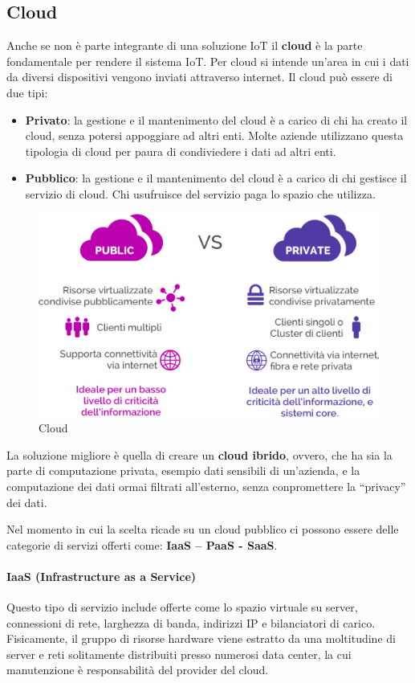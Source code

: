 \documentclass[10pt,a4paper,oneside]{scrbook}
\begin{document}
\subsection{Cloud}
Anche se non è parte integrante di una soluzione IoT il \textbf{cloud} è la parte fondamentale per rendere il sistema IoT.
Per cloud si intende un'area in cui i dati da diversi dispositivi vengono inviati attraverso internet.
Il cloud può essere di due tipi:
\begin{itemize}
    \item \textbf{Privato}: la gestione e il mantenimento del cloud è a carico di chi ha creato il cloud, senza potersi appoggiare ad altri enti.
    Molte aziende utilizzano questa tipologia di cloud per paura di condiviedere i dati ad altri enti. 
    \item \textbf{Pubblico}: la gestione e il mantenimento del cloud è a carico di chi gestisce il servizio di cloud.
    Chi usufruisce del servizio paga lo spazio che utilizza.
\end{itemize}
\begin{figure}[h]
    \centering
    \includegraphics[width=0.6\linewidth]{img/Cloud.png}
    \caption{Cloud}
    \label{fig:Cloud}
\end{figure}
La soluzione migliore è quella di creare un \textbf{cloud ibrido}, ovvero, che ha sia la parte di computazione privata,
esempio dati sensibili di un'azienda, e la computazione dei dati ormai filtrati all'esterno, senza conpromettere la ``privacy'' dei dati.

Nel momento in cui la scelta ricade su un cloud pubblico ci possono essere delle categorie di servizi offerti come: \textbf{IaaS – PaaS - SaaS}.

\paragraph{IaaS (Infrastructure as a Service)}
Questo tipo di servizio include offerte come lo spazio virtuale su server, connessioni di rete, larghezza di banda,
indirizzi IP e bilanciatori di carico. Fisicamente, il gruppo di risorse hardware viene estratto da una moltitudine
di server e reti solitamente distribuiti presso numerosi data center, la cui manutenzione è responsabilità del provider del cloud.
\end{document}
